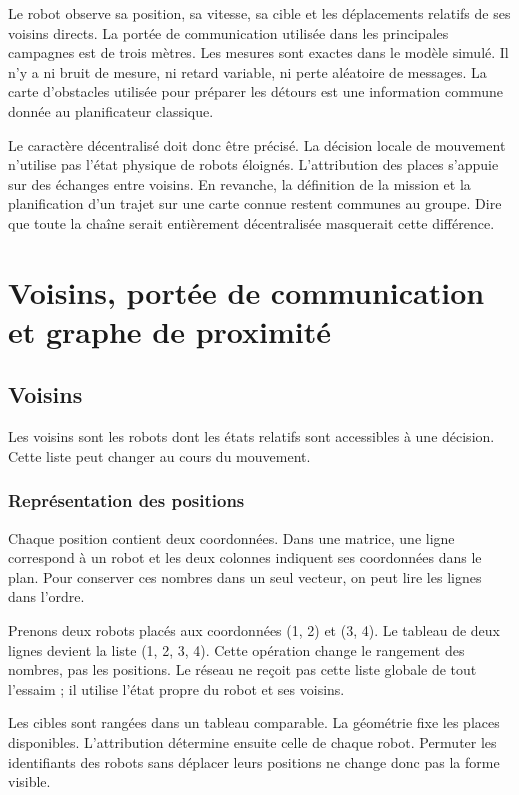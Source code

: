 Le robot observe sa position, sa vitesse, sa cible et les déplacements relatifs de ses voisins directs. La portée de communication utilisée dans les principales campagnes est de trois mètres. Les mesures sont exactes dans le modèle simulé. Il n'y a ni bruit de mesure, ni retard variable, ni perte aléatoire de messages. La carte d'obstacles utilisée pour préparer les détours est une information commune donnée au planificateur classique.

Le caractère décentralisé doit donc être précisé. La décision locale de mouvement n'utilise pas l'état physique de robots éloignés. L'attribution des places s'appuie sur des échanges entre voisins. En revanche, la définition de la mission et la planification d'un trajet sur une carte connue restent communes au groupe. Dire que toute la chaîne serait entièrement décentralisée masquerait cette différence.

\section{Voisins, portée de communication et graphe de proximité}
\subsection{Voisins}
Les voisins sont les robots dont les états relatifs sont accessibles à une décision. Cette liste peut changer au cours du mouvement.

\subsubsection{Représentation des positions}
Chaque position contient deux coordonnées. Dans une matrice, une ligne correspond à un robot et les deux colonnes indiquent ses coordonnées dans le plan. Pour conserver ces nombres dans un seul vecteur, on peut lire les lignes dans l'ordre.

Prenons deux robots placés aux coordonnées (1, 2) et (3, 4). Le tableau de deux lignes devient la liste (1, 2, 3, 4). Cette opération change le rangement des nombres, pas les positions. Le réseau ne reçoit pas cette liste globale de tout l'essaim ; il utilise l'état propre du robot et ses voisins.

Les cibles sont rangées dans un tableau comparable. La géométrie fixe les places disponibles. L'attribution détermine ensuite celle de chaque robot. Permuter les identifiants des robots sans déplacer leurs positions ne change donc pas la forme visible.

